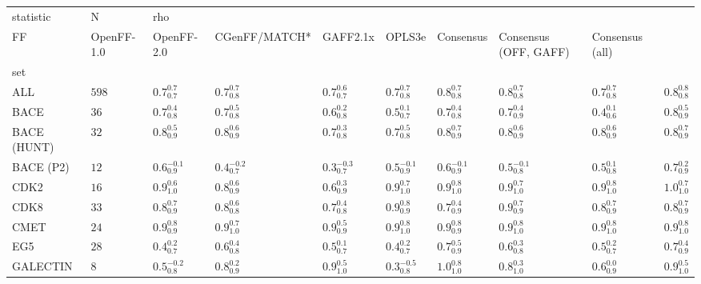 \begin{tabular}{llllllllll}
\toprule
statistic &      N & \multicolumn{8}{l}{rho} \\
FF &           OpenFF-1.0 &          OpenFF-2.0 &        CGenFF/MATCH* &            GAFF2.1x &              OPLS3e &           Consensus & Consensus (OFF, GAFF) &     Consensus (all) \\
set         &        &                      &                     &                      &                     &                     &                     &                       &                     \\
\midrule
ALL         &  $598$ &    $0.7^{0.7}_{0.7}$ &   $0.7^{0.7}_{0.8}$ &    $0.7^{0.6}_{0.7}$ &   $0.7^{0.7}_{0.8}$ &   $0.8^{0.7}_{0.8}$ &   $0.8^{0.7}_{0.8}$ &     $0.7^{0.7}_{0.8}$ &   $0.8^{0.8}_{0.8}$ \\
BACE        &   $36$ &    $0.7^{0.4}_{0.8}$ &   $0.7^{0.5}_{0.8}$ &    $0.6^{0.2}_{0.8}$ &   $0.5^{0.1}_{0.7}$ &   $0.7^{0.4}_{0.8}$ &   $0.7^{0.4}_{0.9}$ &     $0.4^{0.1}_{0.6}$ &   $0.8^{0.5}_{0.9}$ \\
BACE (HUNT) &   $32$ &    $0.8^{0.5}_{0.9}$ &   $0.8^{0.6}_{0.9}$ &    $0.7^{0.3}_{0.8}$ &   $0.7^{0.5}_{0.8}$ &   $0.8^{0.7}_{0.9}$ &   $0.8^{0.6}_{0.9}$ &     $0.8^{0.6}_{0.9}$ &   $0.8^{0.7}_{0.9}$ \\
BACE (P2)   &   $12$ &   $0.6^{-0.1}_{0.9}$ &  $0.4^{-0.2}_{0.7}$ &   $0.3^{-0.3}_{0.7}$ &  $0.5^{-0.1}_{0.9}$ &  $0.6^{-0.1}_{0.9}$ &  $0.5^{-0.1}_{0.8}$ &     $0.5^{0.1}_{0.8}$ &   $0.7^{0.2}_{0.9}$ \\
CDK2        &   $16$ &    $0.9^{0.6}_{1.0}$ &   $0.8^{0.6}_{0.9}$ &    $0.6^{0.3}_{0.9}$ &   $0.9^{0.7}_{1.0}$ &   $0.9^{0.8}_{1.0}$ &   $0.9^{0.7}_{1.0}$ &     $0.9^{0.8}_{1.0}$ &   $1.0^{0.7}_{1.0}$ \\
CDK8        &   $33$ &    $0.8^{0.7}_{0.9}$ &   $0.8^{0.6}_{0.8}$ &    $0.7^{0.4}_{0.8}$ &   $0.9^{0.8}_{0.9}$ &   $0.7^{0.4}_{0.9}$ &   $0.9^{0.7}_{0.9}$ &     $0.8^{0.7}_{0.9}$ &   $0.8^{0.7}_{0.9}$ \\
CMET        &   $24$ &    $0.9^{0.8}_{0.9}$ &   $0.9^{0.7}_{1.0}$ &    $0.9^{0.5}_{0.9}$ &   $0.9^{0.8}_{1.0}$ &   $0.9^{0.8}_{0.9}$ &   $0.9^{0.8}_{1.0}$ &     $0.9^{0.8}_{1.0}$ &   $0.9^{0.8}_{1.0}$ \\
EG5         &   $28$ &    $0.4^{0.2}_{0.7}$ &   $0.6^{0.4}_{0.8}$ &    $0.5^{0.1}_{0.7}$ &   $0.4^{0.2}_{0.7}$ &   $0.7^{0.5}_{0.9}$ &   $0.6^{0.3}_{0.8}$ &     $0.5^{0.2}_{0.7}$ &   $0.7^{0.4}_{0.9}$ \\
GALECTIN    &    $8$ &   $0.5^{-0.2}_{0.8}$ &   $0.8^{0.2}_{0.9}$ &    $0.9^{0.5}_{1.0}$ &  $0.3^{-0.5}_{0.8}$ &   $1.0^{0.8}_{1.0}$ &   $0.8^{0.3}_{1.0}$ &     $0.6^{0.0}_{0.9}$ &   $0.9^{0.5}_{1.0}$ \\

\end{tabular}
